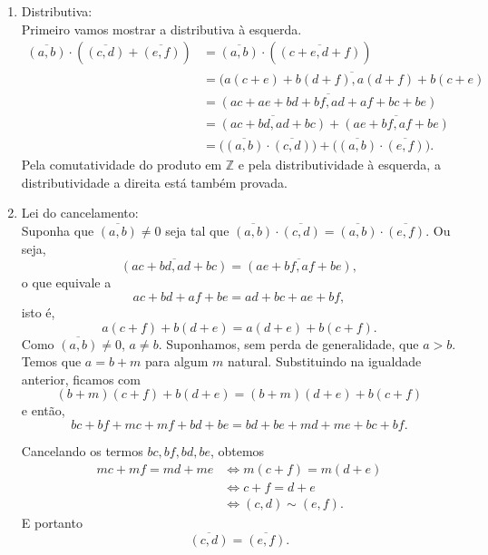 \documentclass[../main.tex]{subfiles}
\begin{document}
\begin{dem}
\begin{enumerate}[label=(\roman*)]
        \item Distributiva: \\
        Primeiro vamos mostrar a distributiva à esquerda.
        \begin{align*}
            \overline{(a,b)} \cdot \left( \overline{(c,d)} + \overline{(e,f)} \right) &= \overline{(a,b)} \cdot (\overline{(c+e,d+f)}) \\
            &= \overline{(a(c+e) + b(d+f), a(d+f) +b(c+e)} \\
            &= \overline{(ac+ae+bd+bf, ad+af+bc+be)} \\
            &= \overline{(ac+bd, ad+bc)} + \overline{(ae+bf, af+be)} \\
            &= \big( \overline{(a,b)} \cdot \overline{(c,d)} \big) + \big( \overline{(a,b)} \cdot \overline{(e,f)} \big)  .  
        \end{align*}
        Pela comutatividade do produto em $\mathbb{Z}$ e pela distributividade à esquerda, a distributividade a direita está também provada.

        \item Lei do cancelamento: \\
        Suponha que $\overline{(a,b)} \neq 0$ seja tal que $\overline{(a,b)} \cdot \overline{(c,d)} = \overline{(a,b)} \cdot \overline{(e,f)}$. Ou seja,  
        \[ \overline{(ac+bd, ad+bc)} = \overline{(ae+bf, af+be)}, \]
        o que equivale a
        \[ ac+bd+af+be = ad+bc+ae+bf, \]
        isto é, 
        \[ a(c+f) + b(d+e) = a(d+e) + b(c+f). \]
        Como $\overline{(a,b)} \neq 0$, $a \neq b$. Suponhamos, sem perda de generalidade, que $a > b$. Temos que $a = b + m$ para algum $m$ natural. Substituindo na igualdade anterior, ficamos com 
        \[ (b+m)(c+f)+ b(d+e) = (b+m)(d+e)+b(c+f) \]
        e então,
        \[ bc + bf + mc + mf + bd + be = bd + be + md + me + bc + bf. \]
        
        Cancelando os termos $bc, bf, bd, be$, obtemos
        \begin{align*}
            mc + mf = md + me 
            &\iff m(c+f) = m(d+e) \\ 
            &\iff c+f = d+e  \\
            &\iff (c,d) \sim (e,f).
        \end{align*}
        E portanto
       \[ \overline{(c,d)} = \overline{(e,f)}. \]
    \end{enumerate}
\end{dem}
\end{document}
